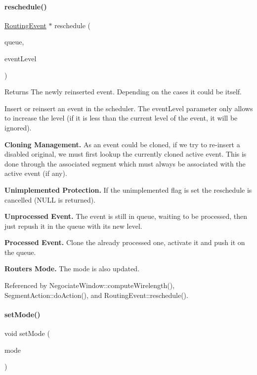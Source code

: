 \paragraph{\texorpdfstring{reschedule()}{reschedule()}}
{\footnotesize\ttfamily \hyperlink{classKite_1_1RoutingEvent}{Routing\+Event} $\ast$ reschedule (\begin{DoxyParamCaption}\item[{\hyperlink{classKite_1_1RoutingEventQueue}{Routing\+Event\+Queue} \&}]{queue,  }\item[{unsigned int}]{event\+Level }\end{DoxyParamCaption})}

\begin{DoxyReturn}{Returns}
The newly reinserted event. Depending on the cases it could be itself.
\end{DoxyReturn}
Insert or reinsert an event in the scheduler. The {\ttfamily event\+Level} parameter only allows to increase the level (if it is less than the current level of the event, it will be ignored).

{\bfseries Cloning Management.} As an event could be cloned, if we try to re-\/insert a disabled original, we must first lookup the currently cloned active event. This is done through the associated {\ttfamily segment} which must always be associated with the active event (if any).

{\bfseries Unimplemented Protection.} If the unimplemented flag is set the reschedule is cancelled ({\ttfamily N\+U\+LL} is returned).

{\bfseries Unprocessed Event.} The event is still in queue, waiting to be processed, then just repush it in the queue with it\textquotesingle{}s new level.

{\bfseries Processed Event.} Clone the already processed one, activate it and push it on the queue.

{\bfseries Router\textquotesingle{}s Mode.} The mode is also updated. 

Referenced by Negociate\+Window\+::compute\+Wirelength(), Segment\+Action\+::do\+Action(), and Routing\+Event\+::reschedule().

\mbox{\label{classKite_1_1RoutingEvent_a85982827650655ef9d6e1206874ead69}} 
\paragraph{\texorpdfstring{set\+Mode()}{setMode()}}
{\footnotesize\ttfamily void set\+Mode (\begin{DoxyParamCaption}\item[{unsigned int}]{mode }\end{DoxyParamCaption})}


